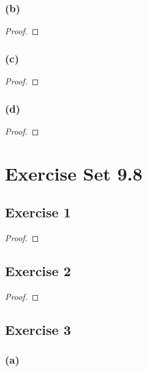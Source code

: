 \documentclass[14pt]{extarticle}
\begin{document}
\subsubsection{(b)}

\begin{proof}

\end{proof}

\subsubsection{(c)}

\begin{proof}

\end{proof}

\subsubsection{(d)}

\begin{proof}

\end{proof}

\section{Exercise Set 9.8}

\subsection{Exercise 1}

\begin{proof}

\end{proof}

\subsection{Exercise 2}

\begin{proof}

\end{proof}

\subsection{Exercise 3}

\subsubsection{(a)}
\end{document}
